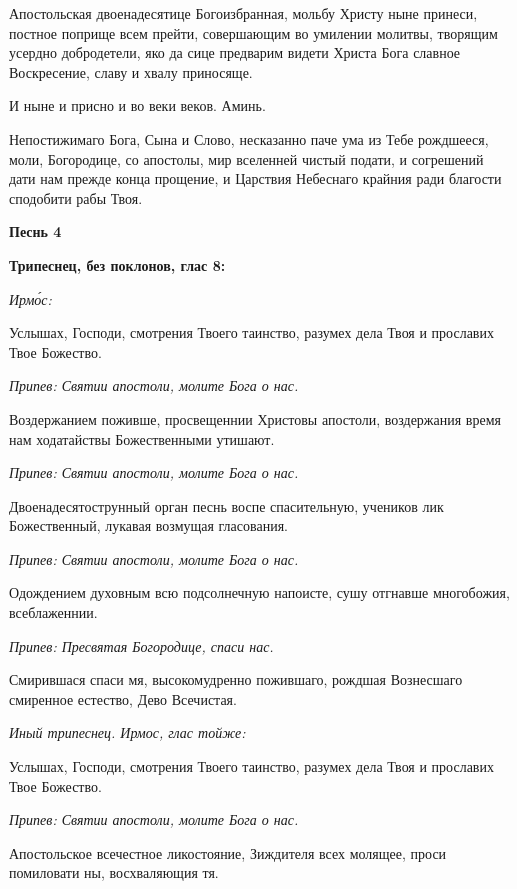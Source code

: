 Апостольская двоенадесятице Богоизбранная, мольбу Христу ныне принеси, постное поприще всем прейти, совершающим во умилении молитвы, творящим усердно добродетели, яко да сице предварим видети Христа Бога славное Воскресение, славу и хвалу приносяще.


И ныне и присно и во веки веков. Аминь.


Непостижимаго Бога, Сына и Слово, несказанно паче ума из Тебе рождшееся, моли, Богородице, со апостолы, мир вселенней чистый подати, и согрешений дати нам прежде конца прощение, и Царствия Небеснаго крайния ради благости сподобити рабы Твоя.





\bfseries Песнь 4\normalfont{}





\bfseries Трипеснец, без поклонов, глас 8:\normalfont{}


\itshape Ирмо́с:\normalfont{}


Услышах, Господи, смотрения Твоего таинство, разумех дела Твоя и прославих Твое Божество.


\itshape Припев:\normalfont{} Святии апостоли, молите Бога о нас.


Воздержанием поживше, просвещеннии Христовы апостоли, воздержания время нам ходатайствы Божественными утишают.


\itshape Припев:\normalfont{} Святии апостоли, молите Бога о нас.


Двоенадесятострунный орган песнь воспе спасительную, учеников лик Божественный, лукавая возмущая гласования.


\itshape Припев:\normalfont{} Святии апостоли, молите Бога о нас.


Одождением духовным всю подсолнечную напоисте, сушу отгнавше многобожия, всеблаженнии.


\itshape Припев:\normalfont{} Пресвятая Богородице, спаси нас.


Смирившася спаси мя, высокомудренно пожившаго, рождшая Вознесшаго смиренное естество, Дево Всечистая.


\itshape Иный трипеснец. Ирмос, глас тойже:\normalfont{}


Услышах, Господи, смотрения Твоего таинство, разумех дела Твоя и прославих Твое Божество.


\itshape Припев:\normalfont{} Святии апостоли, молите Бога о нас.


Апостольское всечестное ликостояние, Зиждителя всех молящее, проси помиловати ны, восхваляющия тя.


